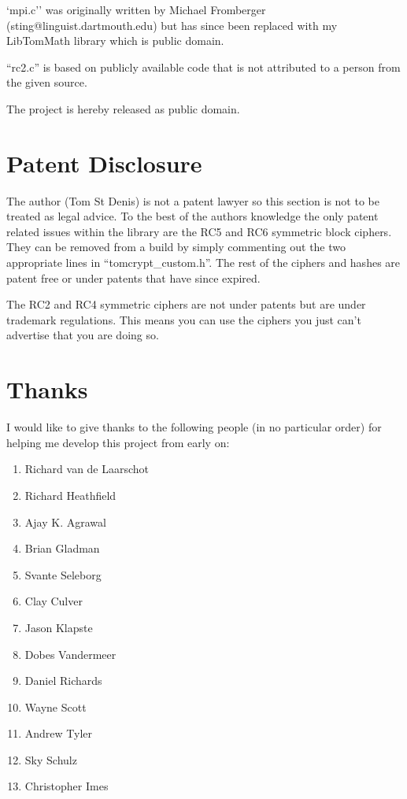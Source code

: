 \documentclass[a4paper]{book}
\begin{document}
`mpi.c'' was originally written by Michael Fromberger (sting@linguist.dartmouth.edu) but has since been replaced with 
my LibTomMath library which is public domain.

``rc2.c'' is based on publicly available code that is not attributed to a person from the given source.  

The project is hereby released as public domain.

\section{Patent Disclosure}

The author (Tom St Denis) is not a patent lawyer so this section is not to be treated as legal advice.  To the best
of the authors knowledge the only patent related issues within the library are the RC5 and RC6 symmetric block ciphers.  
They can be removed from a build by simply commenting out the two appropriate lines in ``tomcrypt\_custom.h''.  The rest
of the ciphers and hashes are patent free or under patents that have since expired.

The RC2 and RC4 symmetric ciphers are not under patents but are under trademark regulations.  This means you can use 
the ciphers you just can't advertise that you are doing so.  

\section{Thanks}
I would like to give thanks to the following people (in no particular order) for helping me develop this project from
early on:
\begin{enumerate}
   \item Richard van de Laarschot
   \item Richard Heathfield
   \item Ajay K. Agrawal
   \item Brian Gladman
   \item Svante Seleborg
   \item Clay Culver
   \item Jason Klapste
   \item Dobes Vandermeer
   \item Daniel Richards
   \item Wayne Scott
   \item Andrew Tyler
   \item Sky Schulz
   \item Christopher Imes
\end{enumerate}
\end{document}
